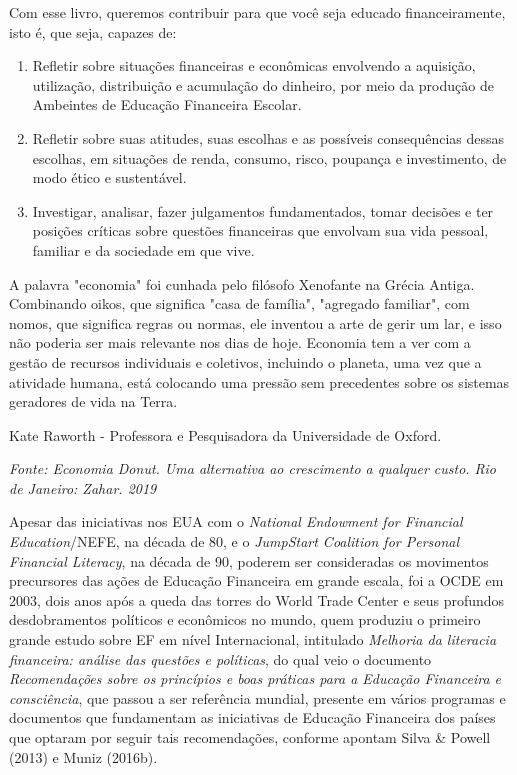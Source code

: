 Com esse livro, queremos contribuir para que você seja educado financeiramente, isto é, que seja, capazes de:

\begin{enumerate}[label=\arabic*.]

\item Refletir sobre situações financeiras e econômicas envolvendo a aquisição, utilização, distribuição e acumulação do dinheiro, por meio da produção de Ambeintes de Educação Financeira Escolar.

\item Refletir sobre suas atitudes, suas escolhas e as possíveis consequências dessas escolhas, em situações de renda, consumo, risco, poupança e investimento, de modo ético e sustentável. 

\item Investigar, analisar, fazer julgamentos fundamentados, tomar decisões e ter posições críticas sobre questões financeiras que envolvam sua vida pessoal, familiar e da sociedade em que vive.

\end{enumerate}

\begin{knowledge}

A palavra "economia"{} foi cunhada pelo filósofo Xenofante na Grécia Antiga. Combinando oikos, que significa "casa de família"{}, "agregado familiar"{}, com nomos, que significa regras ou normas, ele inventou a arte de gerir um lar, e isso não poderia ser mais relevante nos dias de hoje. Economia tem a ver com a gestão de recursos individuais e coletivos, incluindo o planeta, uma vez que a atividade humana, está colocando uma pressão sem precedentes sobre os sistemas geradores de vida na Terra.

\vspace{1em}
Kate Raworth - Professora e Pesquisadora da Universidade de Oxford.

\textit{Fonte: Economia Donut. Uma alternativa ao crescimento a qualquer custo. Rio de Janeiro: Zahar. 2019}

\end{knowledge}

\begin{knowledge}
Apesar das iniciativas nos EUA com o \textit{National Endowment for Financial Education}/NEFE, na década de 80, e o \textit{JumpStart Coalition for Personal Financial Literacy}, na década de 90, poderem ser consideradas os movimentos precursores das ações de Educação Financeira em grande escala, foi a OCDE em 2003, dois anos após a queda das torres do World Trade Center e seus profundos desdobramentos políticos e econômicos no mundo, quem produziu o primeiro grande estudo sobre EF em nível Internacional, intitulado \textit{Melhoria da literacia financeira: análise das questões e políticas}, do qual veio o documento \textit{Recomendações sobre os princípios e boas práticas para a Educação Financeira e consciência}, que passou a ser referência mundial, presente em vários programas e documentos que fundamentam as iniciativas de Educação Financeira dos países que optaram por seguir tais recomendações, conforme apontam Silva \& Powell (2013) e Muniz (2016b).
\end{knowledge}

